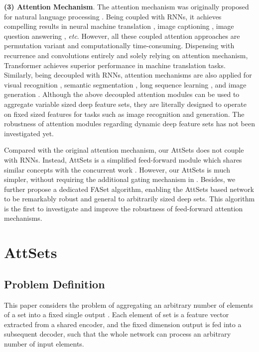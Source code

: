 \documentclass[twocolumn]{svjour3}    \pdfoutput=1
\newcommand{\nickname}{AttSets}
\newcommand{\faset}{FASet}
\newcommand{\etc}{\textit{etc}. }
\begin{document}
\noindent \textbf{(3) Attention Mechanism}. The attention mechanism was originally proposed for natural language processing \citep{Bahdanau2015}. Being coupled with RNNs, it achieves compelling results in neural machine translation \citep{Bahdanau2015}, image captioning \citep{Xu2015b}, image question answering \citep{Yang2016}, \etc However, all these coupled attention approaches are permutation variant and computationally time-consuming. Dispensing with recurrence and convolutions entirely and solely relying on attention mechanism, Transformer \citep{Vaswani2017} achieves superior performance in machine translation tasks. Similarly, being decoupled with RNNs, attention mechanisms are also applied for visual recognition \citep{JieHu2018,Rodriguez2018,Liu2018e,Sarafianos2018,Zhu2018a,Nakka2018,Girdhar2017a}, semantic segmentation \citep{Li2018a}, long sequence learning \citep{Raffel2016}, and image generation \citep{Zhang2018b}. Although the above decoupled attention modules can be used to aggregate variable sized deep feature sets, they are literally designed to operate on fixed sized features for tasks such as image recognition and generation. The robustness of attention modules regarding dynamic deep feature sets has not been investigated yet.

Compared with the original attention mechanism, our \nickname{} does not couple with RNNs. Instead, \nickname{} is a simplified feed-forward module which shares similar concepts with the concurrent work \citep{Ilse2018}. However, our \nickname{} is much simpler, without requiring the additional gating mechanism in \citep{Ilse2018}. Besides, we further propose a dedicated \faset{} algorithm, enabling the \nickname{} based network to be remarkably robust and general to arbitrarily sized deep sets. This algorithm is the first to investigate and improve the robustness of feed-forward attention mechanisms. 
\vspace{-0.25cm}

\section{\nickname{}}
\subsection{Problem Definition}
This paper considers the problem of aggregating an arbitrary number of elements of a set  into a fixed single output . Each element of set  is a feature vector extracted from a shared encoder, and the fixed dimension output  is fed into a subsequent decoder, such that the whole network can process an arbitrary number of input elements. 
\end{document}
